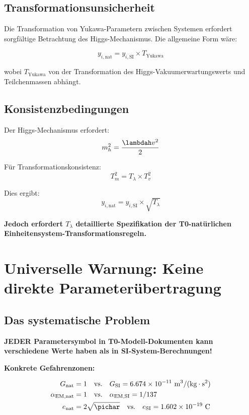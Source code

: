 	\subsection{Transformationsunsicherheit}
	\label{subsec:yukawa_transformation}
	
	Die Transformation von Yukawa-Parametern zwischen Systemen erfordert sorgfältige Betrachtung des Higgs-Mechanismus. Die allgemeine Form wäre:
	
	$$y_{i,\text{nat}} = y_{i,\text{SI}} \times T_{\text{Yukawa}}$$
	
	wobei $T_{\text{Yukawa}}$ von der Transformation des Higgs-Vakuumerwartungswerts und Teilchenmassen abhängt.
	
	\subsection{Konsistenzbedingungen}
	\label{subsec:yukawa_konsistenz}
	
	Der Higgs-Mechanismus erfordert:
	$$m_h^2 = \frac{\lambdah v^2}{2}$$
	
	Für Transformationskonsistenz:
	$$T_m^2 = T_\lambda \times T_v^2$$
	
	Dies ergibt:
	$$y_{i,\text{nat}} = y_{i,\text{SI}} \times \sqrt{T_\lambda}$$
	
	\textbf{Jedoch erfordert $T_\lambda$ detaillierte Spezifikation der T0-natürlichen Einheitensystem-Transformationsregeln.}
	
	\section{Universelle Warnung: Keine direkte Parameterübertragung}
	\label{sec:universelle_warnung}
	
	\subsection{Das systematische Problem}
	\label{subsec:systematisches_problem}
	
	\begin{warning}
		\textbf{JEDER Parametersymbol in T0-Modell-Dokumenten kann verschiedene Werte haben als in SI-System-Berechnungen!}
	\end{warning}
	
	\textbf{Konkrete Gefahrenzonen:}
	
	\begin{align}
		G_{\text{nat}} &= 1 \quad \text{vs.} \quad G_{\text{SI}} = 6.674 \times 10^{-11} \text{ m}^3/(\text{kg} \cdot \text{s}^2) \\
		\alpha_{\text{EM,nat}} &= 1 \quad \text{vs.} \quad \alpha_{\text{EM,SI}} = 1/137 \\
		e_{\text{nat}} &= 2\sqrt{\pichar} \quad \text{vs.} \quad e_{\text{SI}} = 1.602 \times 10^{-19} \text{ C}
	\end{align}
	
